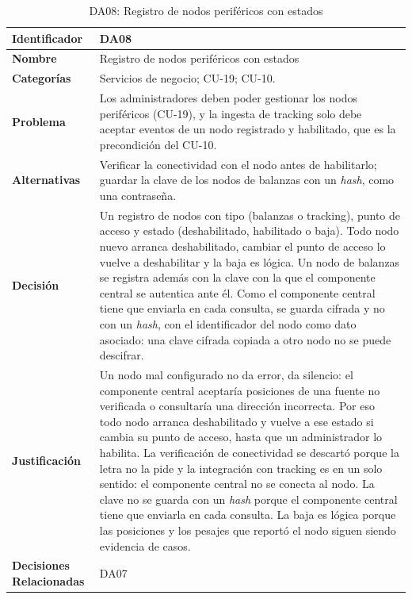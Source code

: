 \begin{table}[H]
    \small
    \centering
    \caption{DA08: Registro de nodos periféricos con estados}
    \label{tab:da08}
    \begin{tabular}{|p{4.1cm}|p{11.7cm}|}
        \hline
            \textbf{Identificador} & DA08 \\
        \hline
            \textbf{Nombre} & Registro de nodos periféricos con estados \\
        \hline
            \textbf{Categorías} & Servicios de negocio; CU-19; CU-10. \\
        \hline
            \textbf{Problema} & Los administradores deben poder gestionar los nodos periféricos (CU-19), y la ingesta de tracking solo debe aceptar eventos de un nodo registrado y habilitado, que es la precondición del CU-10. \\
        \hline
            \textbf{Alternativas} & Verificar la conectividad con el nodo antes de habilitarlo; guardar la clave de los nodos de balanzas con un \textit{hash}, como una contraseña. \\
        \hline
            \textbf{Decisión} & Un registro de nodos con tipo (balanzas o tracking), punto de acceso y estado (deshabilitado, habilitado o baja). Todo nodo nuevo arranca deshabilitado, cambiar el punto de acceso lo vuelve a deshabilitar y la baja es lógica. Un nodo de balanzas se registra además con la clave con la que el componente central se autentica ante él. Como el componente central tiene que enviarla en cada consulta, se guarda cifrada y no con un \textit{hash}, con el identificador del nodo como dato asociado: una clave cifrada copiada a otro nodo no se puede descifrar. \\
        \hline
            \textbf{Justificación} & Un nodo mal configurado no da error, da silencio: el componente central aceptaría posiciones de una fuente no verificada o consultaría una dirección incorrecta. Por eso todo nodo arranca deshabilitado y vuelve a ese estado si cambia su punto de acceso, hasta que un administrador lo habilita. La verificación de conectividad se descartó porque la letra no la pide y la integración con tracking es en un solo sentido: el componente central no se conecta al nodo. La clave no se guarda con un \textit{hash} porque el componente central tiene que enviarla en cada consulta. La baja es lógica porque las posiciones y los pesajes que reportó el nodo siguen siendo evidencia de casos. \\
        \hline
            \textbf{Decisiones Relacionadas} & DA07 \\
        \hline
    \end{tabular}
\end{table}

